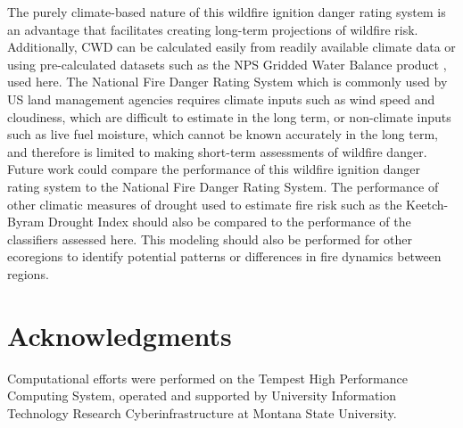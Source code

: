 \documentclass[11pt]{article}
\begin{document}
The purely climate-based nature of this wildfire ignition danger rating system is an advantage that facilitates creating long-term projections of wildfire risk. Additionally, CWD can be calculated easily from readily available climate data or using pre-calculated datasets such as the NPS Gridded Water Balance product \citep{tercekHistoricalChangesPlant2021}, used here. The National Fire Danger Rating System \citep{degrootChapter11Wildland2015} which is commonly used by US land management agencies requires climate inputs such as wind speed and cloudiness, which are difficult to estimate in the long term, or non-climate inputs such as live fuel moisture, which cannot be known accurately in the long term, and therefore is limited to making short-term assessments of wildfire danger. Future work could compare the performance of this wildfire ignition danger rating system to the National Fire Danger Rating System. The performance of other climatic measures of drought used to estimate fire risk such as the Keetch-Byram Drought Index \citep{degrootChapter11Wildland2015} should also be compared to the performance of the classifiers assessed here.  This modeling should also be performed for other ecoregions to identify potential patterns or differences in fire dynamics between regions. 

\section{Acknowledgments}

Computational efforts were performed on the Tempest High Performance Computing System, operated and supported by University Information Technology Research Cyberinfrastructure at Montana State University.


\clearpage

\printbibliography[
heading=bibintoc,
title={References}
]
\end{document}
